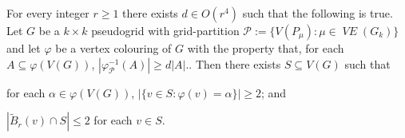 \documentclass{patmorin}
\DeclareMathOperator{\VE}{\mathit{VE}}
\begin{document}
\begin{lem}
  For every integer $r\ge 1$ there exists $d\in O(r^4)$ such that the following is true.
  Let $G$ be a $k\times k$ pseudogrid with grid-partition $\mathcal{P}:=\{V(P_\mu):\mu\in\VE(G_k)\}$ and let $\varphi$ be a vertex colouring of $G$ with the property that, for each $A\subseteq\varphi(V(G))$, $|\varphi_{\mathcal{P}}^{-1}(A)|\ge d|A|$..
  Then there exists $S\subseteq V(G)$ such that
  \begin{compactenum}[(i)]
    \item \label{hits_both} for each $\alpha\in\varphi(V(G))$, $|\{v\in S:\varphi(v)=\alpha\}|\ge 2$; and
    \item \label{spread_out} $|\tilde{B}_r(v)\cap S|\le 2$ for each $v\in S$.
  \end{compactenum}
\end{lem}
\end{document}
